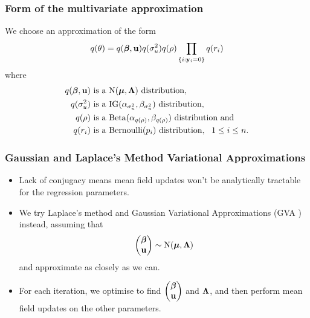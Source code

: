 \documentclass{beamer}
\begin{document}
\begin{frame}
	\frametitle{Form of the multivariate approximation}
	We choose an approximation of the form
	$$
	q(\theta) = q({\boldsymbol \beta}, {\bf u}) q(\sigma_u^2) q(\rho) \prod_{ \{i : {\bf y}_i = 0\} } q(r_i)
	$$
	where
	\begin{align*}
		q({\boldsymbol \beta}, {\bf u}) & \text{ is a } \text{N}({\boldsymbol \mu}, {\boldsymbol \Lambda}) \text{ distribution},                                  \\
		q(\sigma_u^2)  & \text{ is a } \text{IG}(\alpha_{\sigma_u^2}, \beta_{\sigma_u^2}) \text{ distribution},        \\
		q(\rho)        & \text{ is a } \text{Beta}(\alpha_{q(\rho)}, \beta_{q(\rho)}) \text{ distribution} \text{ and} \\
		q(r_i)         & \text{ is a } \text{Bernoulli}(p_i) \text{ distribution}, \ \ 1 \leq i \leq n.                
	\end{align*}
\end{frame}

\begin{frame}
	\frametitle{Gaussian and Laplace's Method Variational Approximations}
	\begin{itemize}
		\item Lack of conjugacy means mean field updates won't be analytically tractable for the regression parameters.
		\item We try Laplace's method and Gaussian Variational Approximations (GVA \cite{Ormerod2012}) instead, assuming that
		      $$
		      \begin{pmatrix}
		      	{\boldsymbol\beta} \\
		      	{\bf u}    
		      \end{pmatrix}
		      \sim \text{N}({\boldsymbol \mu}, {\boldsymbol \Lambda})
		      $$
		      and approximate as closely as we can.
		\item For each iteration, we optimise to find
		      $\begin{pmatrix}
		      	{\boldsymbol\beta} \\
		      	{\bf u}    
		      \end{pmatrix}
		      $ and ${\boldsymbol \Lambda}$,
		      and then perform mean field updates on the other parameters.
	\end{itemize}
\end{frame}
\end{document}
